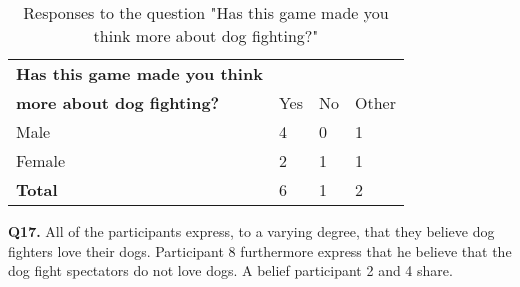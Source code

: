 \begin{table}[h]
\centering
\begin{tabular}{l l l l}
\hline
\textbf{Has this game made you think}\\
\textbf{more about dog fighting?} & Yes & No & Other \\
\hline
Male & 4 & 0 & 1 \\
Female & 2 & 1 & 1 \\
\textbf{Total} & 6 & 1 & 2 \\
\hline
\end{tabular}
\caption{\label{tab:thin}Responses to the question "Has this game made you think more about dog fighting?"}
\end{table}


\textbf{Q17.} All of the participants express, to a varying degree, that they believe dog fighters love their dogs. Participant 8 furthermore express that he believe that the dog fight spectators do not love dogs. A belief participant 2 and 4 share.